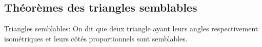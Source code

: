 \documentclass[a4paper,12pt]{article}
\begin{document}
\pagebreak
\subsection{Théorèmes des triangles semblables}
\begin{definition}{Triangles semblables:}
On dit que deux triangle ayant leurs angles respectivement isométriques et leurs côtés proportionnels sont semblables.
\end{definition}
\end{document}

